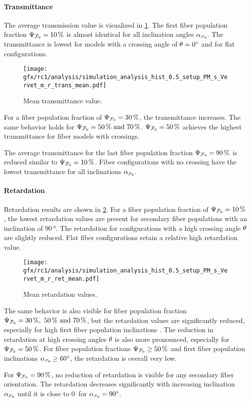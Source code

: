 \paragraph{Transmittance}
%
The average transmission value is visualized in \cref{fig:sim_ana_trans}.
The first fiber population fraction $\textnormal{$\Psi_{\textnormal{$\mathcal{F}_0$}}$}=\SI{10}{\percent}$ is almost identical for all inclination angles $\modelInc$.
The transmittance is lowest for models with a crossing angle of $\textnormal{$\theta$} = \SI{0}{\degree}$ and for flat configurations.
\par
%
\begin{figure}[!p]
\centering
\texttt{[image: gfx/rc1/analysis/simulation\_analysis\_hist\_0.5\_setup\_PM\_s\_Vervet\_m\_r\_trans\_mean.pdf]}
\caption[]{Mean transmittance value.}
\label{fig:sim_ana_trans}
\end{figure}
%
For a fiber population fraction of $\textnormal{$\Psi_{\textnormal{$\mathcal{F}_0$}}$}=\SI{30}{\percent}$, the transmittance increases.
The same behavior holds for $\modelPsi=\SIlist{50;70}{\percent}$.
$\textnormal{$\Psi_{\textnormal{$\mathcal{F}_0$}}$}=\SI{50}{\percent}$ achieves the highest transmittance for fiber models with crossings.
\par
%
The average transmittance for the last fiber population fraction $\textnormal{$\Psi_{\textnormal{$\mathcal{F}_0$}}$}=\SI{90}{\percent}$ is reduced similar to $\textnormal{$\Psi_{\textnormal{$\mathcal{F}_0$}}$}=\SI{10}{\percent}$.
Fiber configurations with no crossing have the lowest transmittance for all inclinations $\modelInc$.
%
%
%
\paragraph{Retardation}
%
Retardation results are shown in \cref{fig:sim_ana_ret}.
For a fiber population fraction of $\textnormal{$\Psi_{\textnormal{$\mathcal{F}_0$}}$}=\SI{10}{\percent}$, the lowest retardation values are present for secondary fiber populations with an inclination of $\SI{90}{\degree}$.
The retardation for configurations with a high crossing angle $\textnormal{$\theta$}$ are slightly reduced.
Flat fiber configurations retain a relative high retardation value.
\par
%
\begin{figure}[!p]
\centering
\texttt{[image: gfx/rc1/analysis/simulation\_analysis\_hist\_0.5\_setup\_PM\_s\_Vervet\_m\_r\_ret\_mean.pdf]}
\caption[]{Mean retardation values.}
\label{fig:sim_ana_ret}
\end{figure}
%
The same behavior is also visible for fiber population fraction $\modelPsi=\SIlist{30;50;70}{\percent}$, but the retardation values are significantly reduced, especially for high first fiber population inclinations \modelInc{}.
The reduction in retardation at high crossing angles $\textnormal{$\theta$}$ is also more pronounced, especially for $\textnormal{$\Psi_{\textnormal{$\mathcal{F}_0$}}$}=\SI{50}{\percent}$.
For fiber population fractions $\textnormal{$\Psi_{\textnormal{$\mathcal{F}_0$}}$} \geq \SI{50}{\percent}$ and first fiber population inclinations $\modelInc \geq \SI{60}{\degree}$, the retardation is overall very low.
\par
%
For $\textnormal{$\Psi_{\textnormal{$\mathcal{F}_0$}}$}=\SI{90}{\percent}$, no reduction of retardation is visible for any secondary fiber orientation.
The retardation decreases significantly with increasing inclination $\modelInc$ until it is close to $\SI{0}{}$ for $\modelInc=\SI{90}{\degree}$.
%
%
%
